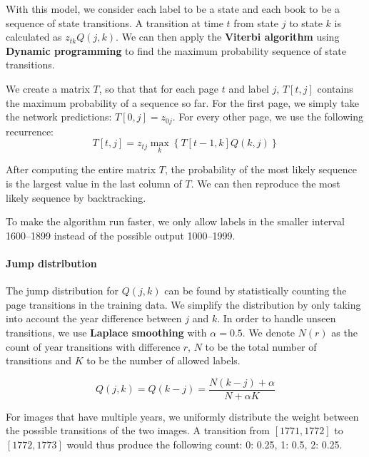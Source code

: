 With this model, we consider each label to be a state and each book to be a sequence of state transitions. A transition at time $t$ from state $j$ to state $k$ is calculated as $z_{tk} Q(j, k)$. We can then apply the \textbf{Viterbi algorithm} using \textbf{Dynamic programming} to find the maximum probability sequence of state transitions.

We create a matrix $T$, so that that for each page $t$ and label $j$, $T[t,j]$ contains the maximum probability of a sequence so far. For the first page, we simply take the network predictions: $T[0,j] = z_{0j}$. For every other page, we use the following recurrence:
\[
T[t,j] = z_{tj} \max_k \left\{ T[t-1,k] Q(k, j) \right\}
\]

After computing the entire matrix $T$, the probability of the most likely sequence is the largest value in the last column of $T$. We can then reproduce the most likely sequence by backtracking.

To make the algorithm run faster, we only allow labels in the smaller interval 1600--1899 instead of the possible output 1000--1999.

\paragraph{Jump distribution}
The jump distribution for $Q(j, k)$ can be found by statistically counting the page transitions in the training data. We simplify the distribution by only taking into account the year difference between $j$ and $k$. In order to handle unseen transitions, we use \textbf{Laplace smoothing} with $\alpha=0.5$. We denote $N(r)$ as the count of year transitions with difference $r$, $N$ to be the total number of transitions and $K$ to be the number of allowed labels.

\[
Q(j, k) = Q(k-j) = \frac{N(k-j) + \alpha}{N + \alpha K}
\]

For images that have multiple years, we uniformly distribute the weight between the possible transitions of the two images. A transition from $[1771, 1772]$ to $[1772, 1773]$ would thus produce the following count: {0: 0.25, 1: 0.5, 2: 0.25}.
